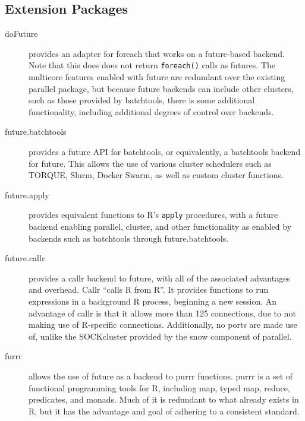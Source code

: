 \hypertarget{sec:extension-packages}{%
    \subsection{Extension Packages}\label{sec:extension-packages}}

\begin{description}
    \item[doFuture]
        \cite{bengtsson20do} provides an adapter for foreach\cite{microsoft20}
        that works on a future-based backend. Note that this does does not
        return \texttt{foreach()} calls as futures. The multicore features enabled with
        future are redundant over the existing parallel package, but because
        future backends can include other clusters, such as those provided by
        batchtools, there is some additional functionality, including additional
        degrees of control over backends.
    \item[future.batchtools]
        \cite{bengtsson19batch} provides a future API for
        batchtools\cite{lang17}, or equivalently, a batchtools backend for
        future. This allows the use of various cluster schedulers such as
        TORQUE, Slurm, Docker Swarm, as well as custom cluster functions.
    \item[future.apply]
        \cite{bengtsson20apply} provides equivalent functions to R's
        \texttt{apply} procedures, with a future backend enabling parallel,
        cluster, and other functionality as enabled by backends such as
        batchtools through future.batchtools.
    \item[future.callr]
        \cite{bengtsson19callr} provides a callr\cite{csardi20} backend to
        future, with all of the associated advantages and overhead. Callr
        ``calls R from R''. It provides functions to run expressions in a
        background R process, beginning a new session. An advantage of callr is
        that it allows more than 125 connections, due to not making use of
        R-specific connections. Additionally, no ports are made use of, unlike
        the SOCKcluster provided by the snow component of parallel.
    \item[furrr]
        \cite{vaughan18} allows the use of future as a backend to purrr
        functions. purrr is a set of functional programming tools for R,
        including map, typed map, reduce, predicates, and monads. Much of it is
        redundant to what already exists in R, but it has the advantage and goal
        of adhering to a consistent standard.
\end{description}

